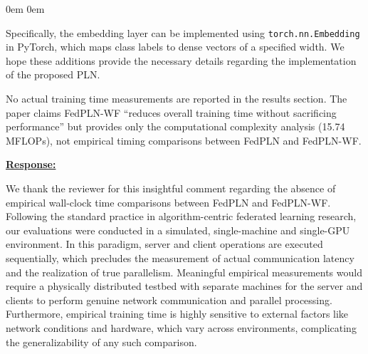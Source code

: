 \documentclass[a4paper,12pt]{article}
\begin{document}
\leftskip 0em
\rightskip 0em
\medskip

\noindent
Specifically, the embedding layer can be implemented using \texttt{torch.nn.Embedding} in PyTorch, which maps class labels to dense vectors of a specified width.
We hope these additions provide the necessary details regarding the implementation of the proposed PLN.

\begin{tcolorbox}[title = {Comment 6},fonttitle = \bfseries]
	No actual training time measurements are reported in the results section. The paper claims FedPLN-WF ``reduces overall training time without sacrificing performance'' but provides only the computational complexity analysis (15.74 MFLOPs), not empirical timing comparisons between FedPLN and FedPLN-WF.
\end{tcolorbox}
\noindent \underline {\textbf{Response:}}
\bigskip


We thank the reviewer for this insightful comment regarding the absence of empirical wall-clock time comparisons between FedPLN and FedPLN-WF.
Following the standard practice in algorithm-centric federated learning research, our evaluations were conducted in a simulated, single-machine and single-GPU environment.
In this paradigm, server and client operations are executed sequentially, which precludes the measurement of actual communication latency and the realization of true parallelism.
Meaningful empirical measurements would require a physically distributed testbed with separate machines for the server and clients to perform genuine network communication and parallel processing.
Furthermore, empirical training time is highly sensitive to external factors like network conditions and hardware, which vary across environments, complicating the generalizability of any such comparison.
\end{document}
